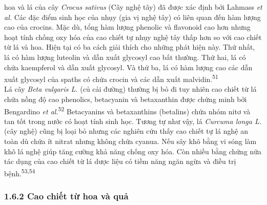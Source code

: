 \documentclass[
  letterpaper,
  DIV=11,
  numbers=noendperiod]{scrartcl}
\begin{document}
hoa và lá của cây \emph{Crocus sativus} (Cây nghệ tây) đã được xác định
bởi Lahmass \emph{et al.} Các đặc điểm sinh học của nhụy (gia vị nghệ
tây) có liên quan đến hàm lượng cao của crocins. Mặc dù, tổng hàm lượng
phenolic và flavonoid cao hơn nhưng hoạt tính chống oxy hóa của cao
chiết tự nhụy nghệ tây thấp hơn so với cao chiết từ lá và hoa. Hiện tại
có ba cách giải thích cho những phát hiện này. Thứ nhất, lá có hàm lượng
luteolin và dẫn xuất glycosyl cao bất thường. Thứ hai, lá có chứa
kaempferol và dẫn xuất glycosyl. Và thứ ba, lá có hàm lượng cao các dẫn
xuất glycosyl của spaths có chứa crocin và các dẫn xuất
malvidin.\textsuperscript{51}\\
Lá cây \emph{Beta vulgaris L.} (củ cải đường) thường bị bỏ đi tuy nhiên
cao chiết từ lá chứa nồng độ cao phenolics, betacyanin và betaxanthin
được chứng minh bởi Bengardino \emph{et al.}\textsuperscript{52}
Betacyanins và betaxanthins (betalins) chứa nhóm nitơ và tan tốt trong
nước có hoạt tính sinh học. Tương tự như vậy, lá \emph{Curcuma longa L.}
(cây nghệ) cũng bị loại bỏ nhưng các nghiên cứu thấy cao chiết tự lá
nghệ an toàn dù chứa ít nitrat nhưng không chứa cyanua. Nếu sây khô bằng
vi sóng làm khô lá nghệ giúp tăng cường khả năng chống oxy hóa. Còn
nhiều bằng chứng nữa tác dụng của cao chiết từ lá dược liệu có tiềm năng
ngăn ngừa và điều trị bệnh.\textsuperscript{53,54}

\subsubsection{1.6.2 Cao chiết từ hoa và
quả}\label{cao-chiux1ebft-tux1eeb-hoa-vuxe0-quux1ea3}
\end{document}

